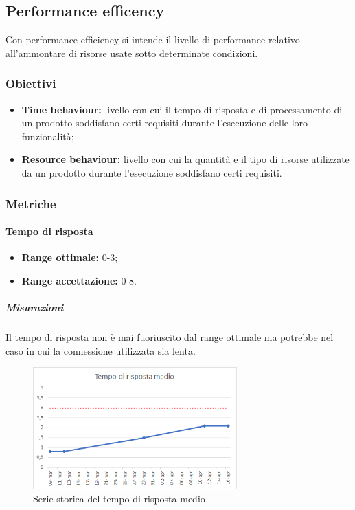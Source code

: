 	\subsection{Performance efficency}
		Con performance efficiency si intende il livello di performance relativo all'ammontare di risorse usate sotto determinate condizioni. 
		\subsubsection{Obiettivi}
			\begin{itemize}
				\item {\textbf{Time behaviour:} livello con cui il tempo di risposta e di processamento di un prodotto soddisfano certi requisiti durante l'esecuzione delle loro funzionalità;}
				\item {\textbf{Resource behaviour:} livello con cui la quantità e il tipo di risorse utilizzate da un prodotto durante l'esecuzione soddisfano certi requisiti.}
			\end{itemize}
		\subsubsection{Metriche}
			\paragraph{Tempo di risposta} \Spazio
			\begin{itemize}
				\item {\textbf{Range ottimale:} 0-3;}
				\item {\textbf{Range accettazione:} 0-8.}
			\end{itemize} 
		     \subparagraph{Misurazioni}
		      Il tempo di risposta non è mai fuoriuscito dal range ottimale ma potrebbe nel caso in cui la connessione utilizzata sia lenta.
		      \begin{figure}[H]
		      \centering 
		      \includegraphics[width=0.7\textwidth]{Images/risposta.png}
		    	\caption{Serie storica del tempo di risposta medio}
		    	\label{risposta} 
		    \end{figure}
	       
